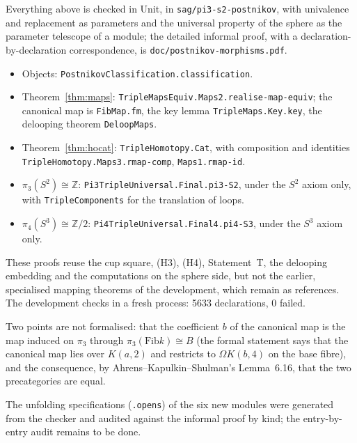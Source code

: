 \documentclass[11pt]{amsart}
\theoremstyle{remark}
\newcommand{\code}[1]{\texttt{\hyphenchar\font=45\relax #1}}
\newcommand{\Om}{\Omega}
\newcommand{\Fib}{\mathrm{Fib}}
\newcommand{\Z}{\mathbb{Z}}
\begin{document}
Everything above is checked in Unit, in \code{sag/pi3-s2-postnikov}, with
univalence and replacement as parameters and the universal property of the
sphere as the parameter telescope of a module; the detailed informal proof,
with a declaration-by-declaration correspondence, is
\code{doc/postnikov-morphisms.pdf}.
\begin{itemize}
\item Objects: \code{PostnikovClassification.classification}.
\item Theorem~\ref{thm:maps}: \code{TripleMapsEquiv.Maps2.realise-map-equiv}; the
canonical map is \code{FibMap.fm}, the key lemma \code{TripleMaps.Key.key}, the
delooping theorem \code{DeloopMaps}.
\item Theorem~\ref{thm:hocat}: \code{TripleHomotopy.Cat}, with composition and
identities \code{TripleHomotopy.Maps3.rmap-comp}, \code{Maps1.rmap-id}.
\item $\pi_3(S^2)\cong\Z$: \code{Pi3TripleUniversal.Final.pi3-S2}, under the $S^2$
axiom only, with \code{TripleComponents} for the translation of loops.
\item $\pi_4(S^3)\cong\Z/2$: \code{Pi4TripleUniversal.Final4.pi4-S3}, under the
$S^3$ axiom only.
\end{itemize}
These proofs reuse the cup square, (H3), (H4), Statement~T, the delooping
embedding and the computations on the sphere side, but not the earlier,
specialised mapping theorems of the development, which remain as references.
The development checks in a fresh process: 5633 declarations, 0 failed.

Two points are not formalised: that the coefficient $b$ of the canonical map is
the map induced on $\pi_3$ through $\pi_3(\Fib k)\cong B$ (the formal statement
says that the canonical map lies over $K(a,2)$ and restricts to $\Om K(b,4)$ on
the base fibre), and the consequence, by Ahrens--Kapulkin--Shulman's
Lemma~6.16, that the two precategories are equal.

The unfolding specifications (\code{.opens}) of the six new modules were
generated from the checker and audited against the informal proof by kind; the
entry-by-entry audit remains to be done.
\end{document}
